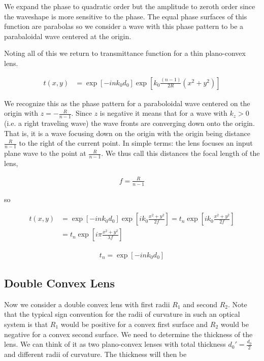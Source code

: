 \documentclass[12pt]{article}
\begin{document}
We expand the phase to quadratic order but the amplitude to zeroth order since the waveshape is more sensitive to the phase. The equal phase surfaces of this function are parabolas so we consider a wave with this phase pattern to be a parabaloidal wave centered at the origin.

Noting all of this we return to transmittance function for a thin plano-convex lens.

\begin{align}
t(x,y) &= \exp[-i n k_0 d_0] \exp\left[k_0\frac{(n-1)}{2R} (x^2+y^2)\right]
\end{align}

We recognize this as the phase pattern for a paraboloidal wave centered on the origin with $z = -\frac{R}{n-1}$. Since $z$ is negative it means that for a wave with $k_z>0$ (i.e. a right traveling wave) the wave fronts are converging down onto the origin. That is, it is a wave focusing down on the origin with the origin being distance $\frac{R}{n-1}$ to the right of the current point. In simple terms: the lens focuses an input plane wave to the point at $\frac{R}{n-1}$. We thus call this distances the focal length of the lens,

\begin{align}
f = \frac{R}{n-1}
\end{align}

so

\begin{align}
t(x,y) &= \exp[-i n k_0 d_0] \exp\left[ik_0\frac{x^2+y^2}{2f}\right] = t_n \exp\left[ik_0\frac{x^2+y^2}{2f}\right]\\
&= t_n \exp\left[i\pi\frac{x^2+y^2}{\lambda f}\right]
\end{align}

\begin{align}
t_n = \exp[-i n k_0 d_0]
\end{align}

\subsection{Double Convex Lens}
Now we consider a double convex lens with first radii $R_1$ and second $R_2$. Note that the typical sign convention for the radii of curvature in such an optical system is that $R_1$ would be positive for a convex first surface and $R_2$ would be negative for a convex second surface. We need to determine the thickness of the lens. We can think of it as two plano-convex lenses with total thickness $d_0' = \frac{d_0}{2}$ and different radii of curvature. The thickness will then be 
\end{document}

